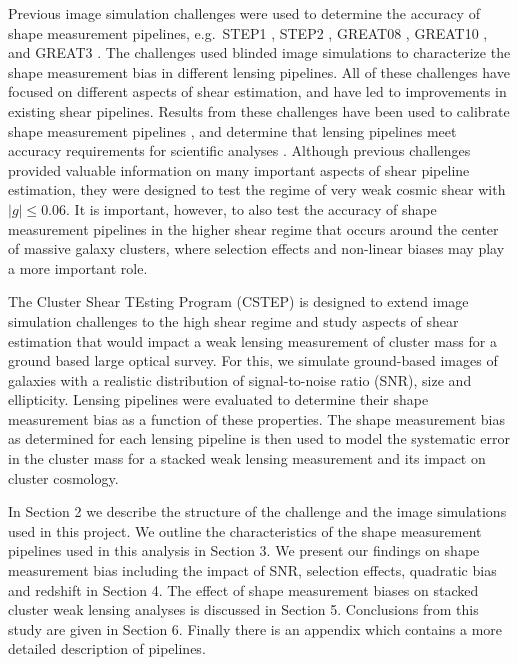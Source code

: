 \documentclass[useAMS,usenatbib]{mn2e}
\begin{document}
Previous image simulation challenges were used to determine
the accuracy of shape measurement pipelines, e.g.~STEP1 \citep{STEP1},
STEP2 \citep{STEP2}, GREAT08 \citep{GREAT08}, GREAT10
\citep{GREAT10}, and GREAT3 \citep{great3}. The challenges used blinded image
simulations to characterize the shape measurement bias in
different lensing pipelines. All of these challenges have focused on
different aspects of shear estimation, and have led to
improvements in existing shear pipelines. Results from these challenges have been
used to calibrate shape measurement pipelines \citep[e.g.][]{Apple},
and determine that lensing pipelines meet accuracy requirements for scientific
analyses \citep[e.g.][]{Berge}. Although previous challenges provided valuable information on many important
aspects of shear pipeline estimation, they were designed to test the regime of very weak cosmic shear with $|g| \leq 0.06$. 
It is important, however, to also test the accuracy of shape measurement
pipelines in the higher shear regime that occurs around the center of
massive galaxy clusters, where selection effects and non-linear biases
may play a more important role.


The Cluster Shear TEsting Program (CSTEP) is designed to extend image
simulation challenges to the high shear regime and study aspects of
shear estimation that would impact a weak lensing measurement of
cluster mass for a ground based large optical survey. For this, we
simulate ground-based images of galaxies with a realistic
distribution of signal-to-noise ratio (SNR), size and ellipticity. Lensing pipelines
were evaluated to determine their shape measurement bias as a
function of these properties. The shape measurement bias as 
determined for each lensing pipeline is then used to model the 
systematic error in the cluster mass for a stacked weak lensing measurement and its impact on cluster cosmology.


In Section 2 we describe the structure of the challenge and the image simulations used in this
project. We outline the characteristics of the shape
measurement pipelines used in this analysis in Section 3. We present
our findings on shape measurement bias including the impact of SNR, selection
effects, quadratic bias and redshift in Section 4. The
effect of shape measurement biases on stacked cluster weak lensing
analyses is discussed in Section 5.  Conclusions from this study are 
given in Section 6.  Finally there is an appendix which contains a more detailed
description of pipelines. 
\end{document}
